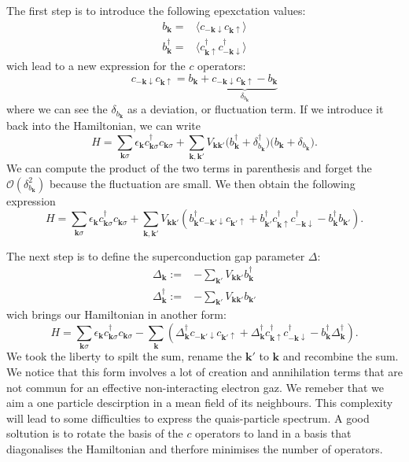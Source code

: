 \documentclass[../main.tex]{subfile}
\begin{document}
The first step is to introduce the following epexctation values:
\begin{align}
    b_{\bm{k}} = &\langle c_{-\bm{k}\downarrow}c_{\bm{k}\uparrow}\rangle \label{eq:ExpectBCS} \\
    b_{\bm{k}}^{\dagger} = &\langle c_{\bm{k}\uparrow}^{\dagger}c_{-\bm{k}\downarrow}^{\dagger}\rangle  \label{eq:ExpectBCSDag}
\end{align}
wich lead to a new expression for the $c$ operators:
\begin{equation}
    c_{-\bm{k}\downarrow}c_{\bm{k}\uparrow} = b_{\bm{k}} + \underbrace{c_{-\bm{k}\downarrow}c_{\bm{k}\uparrow} - b_{\bm{k}}}_{\delta_{b_{\bm{k}}}}
\end{equation}
where we can see the $\delta_{b_{\bm{k}}}$ as a deviation, or fluctuation term. If we introduce it back into the Hamiltonian, we can write
\[
    H = \sum_{\bm{k}\sigma} \epsilon_{\bm{k}} c_{\bm{k}\sigma}^{\dagger}c_{\bm{k}\sigma} + \sum_{\bm{k},\bm{k}'} V_{\bm{k}\bm{k}'} \bigl( b_{\bm{k}}^{\dagger} + \delta_{b_{\bm{k}}}^{\dagger}\bigr)\bigl( b_{\bm{k}} + \delta_{b_{\bm{k}}}\bigr).
\]
We can compute the product of the two terms in parenthesis and forget the $\mathcal{O}\left(\delta_{b_{\bm{k}}}^2\right)$ because the fluctuation are small. We then obtain the following expression
\[
    H = \sum_{\bm{k}\sigma} \epsilon_{\bm{k}} c_{\bm{k}\sigma}^{\dagger}c_{\bm{k}\sigma} + \sum_{\bm{k},\bm{k}'} V_{\bm{k}\bm{k}'} \left( b_{\bm{k}}^{\dagger}c_{-\bm{k}'\downarrow}c_{\bm{k}'\uparrow}  + b_{\bm{k}'}^{\dagger} c_{\bm{k}\uparrow} ^{\dagger}c_{-\bm{k}\downarrow}^{\dagger} -  b_{\bm{k}}^{\dagger} b_{\bm{k}'}\right).
\]

The next step is to define the superconduction gap parameter $\Delta$:
\begin{align}
    \Delta_{\bm{k}} := &-\sum_{\bm{k}'} V_{\bm{k}\bm{k}'} b_{\bm{k}}^{\dagger}\\
    \Delta^{\dagger}_{\bm{k}} := &-\sum_{\bm{k}'} V_{\bm{k}\bm{k}'} b_{\bm{k}'}\label{eq:DeltaBaseDef}
\end{align}
wich brings our Hamiltonian in another form:
\begin{equation} \label{eq:HamiltonianBCS1}
    H = \sum_{\bm{k}\sigma} \epsilon_{\bm{k}} c_{\bm{k}\sigma}^{\dagger}c_{\bm{k}\sigma} - \sum_{\bm{k}} \left( \Delta_{\bm{k}}^{\dagger} c_{-\bm{k}'\downarrow}c_{\bm{k}'\uparrow}  + \Delta_{\bm{k}}^{\dagger} c_{\bm{k}\uparrow} ^{\dagger}c_{-\bm{k}\downarrow}^{\dagger} -  b_{\bm{k}}^{\dagger} \Delta_{\bm{k}}^{\dagger} \right).
\end{equation}
We took the liberty to spilt the sum, rename the $\bm{k}'$ to $\bm{k}$ and recombine the sum. We notice that this form involves a lot of creation and annihilation terms that 
are not commun for an effective non-interacting electron gaz. We remeber that we aim a one particle descirption in a mean field of its neighbours.
This complexity will lead to some difficulties to express the quais-particle spectrum. A good soltution is 
to rotate the basis of the $c$ operators to land in a basis that diagonalises the Hamiltonian and therfore minimises the number of operators.\\
\end{document}

